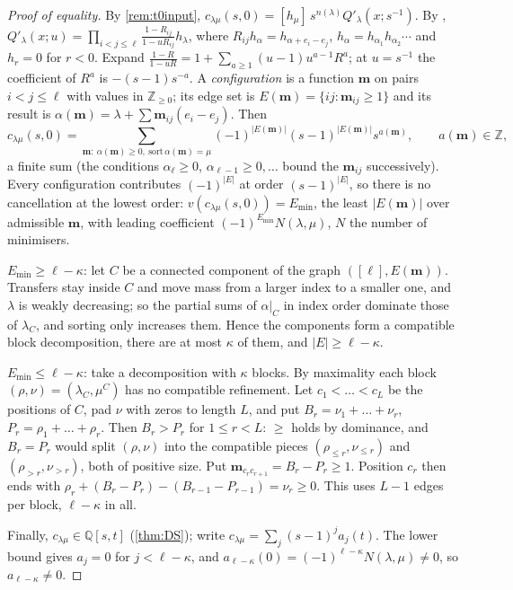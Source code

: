 \documentclass[11pt]{amsart}
\theoremstyle{definition}
\theoremstyle{remark}
\numberwithin{equation}{section}
\newcommand{\val}{v}
\begin{document}
\begin{proof}[Proof of equality]
By \cref{rem:t0input}, $c_{\lambda\mu}(s,0)=[h_\mu]\,s^{n(\lambda)}Q'_\lambda(x;s^{-1})$. By \cite[III (2.15$'$) with \S5 Ex.~7(a)]{Macdonald95}, $Q'_\lambda(x;u)=\prod_{i<j\le\ell}\frac{1-R_{ij}}{1-uR_{ij}}h_\lambda$, where $R_{ij}h_\alpha=h_{\alpha+e_i-e_j}$, $h_\alpha=h_{\alpha_1}h_{\alpha_2}\cdots$ and $h_r=0$ for $r<0$. Expand $\frac{1-R}{1-uR}=1+\sum_{a\ge1}(u-1)u^{a-1}R^a$; at $u=s^{-1}$ the coefficient of $R^a$ is $-(s-1)s^{-a}$. A \emph{configuration} is a function $\mathbf m$ on pairs $i<j\le\ell$ with values in $\mathbb{Z}_{\ge0}$; its edge set is $E(\mathbf m)=\{ij:\mathbf m_{ij}\ge1\}$ and its result is $\alpha(\mathbf m)=\lambda+\sum\mathbf m_{ij}(e_i-e_j)$. Then
\[ c_{\lambda\mu}(s,0)=\sum_{\mathbf m:\ \alpha(\mathbf m)\ge0,\ \mathrm{sort}\,\alpha(\mathbf m)=\mu}(-1)^{|E(\mathbf m)|}(s-1)^{|E(\mathbf m)|}s^{a(\mathbf m)},\qquad a(\mathbf m)\in\mathbb{Z}, \]
a finite sum (the conditions $\alpha_\ell\ge0$, $\alpha_{\ell-1}\ge0,\dots$ bound the $\mathbf m_{ij}$ successively). Every configuration contributes $(-1)^{|E|}$ at order $(s-1)^{|E|}$, so there is no cancellation at the lowest order: $\val(c_{\lambda\mu}(s,0))=E_{\min}$, the least $|E(\mathbf m)|$ over admissible $\mathbf m$, with leading coefficient $(-1)^{E_{\min}}N(\lambda,\mu)$, $N$ the number of minimisers.

$E_{\min}\ge\ell-\kappa$: let $C$ be a connected component of the graph $([\ell],E(\mathbf m))$. Transfers stay inside $C$ and move mass from a larger index to a smaller one, and $\lambda$ is weakly decreasing; so the partial sums of $\alpha|_C$ in index order dominate those of $\lambda_C$, and sorting only increases them. Hence the components form a compatible block decomposition, there are at most $\kappa$ of them, and $|E|\ge\ell-\kappa$.

$E_{\min}\le\ell-\kappa$: take a decomposition with $\kappa$ blocks. By maximality each block $(\rho,\nu)=(\lambda_C,\mu^C)$ has no compatible refinement. Let $c_1<\dots<c_L$ be the positions of $C$, pad $\nu$ with zeros to length $L$, and put $B_r=\nu_1+\dots+\nu_r$, $P_r=\rho_1+\dots+\rho_r$. Then $B_r>P_r$ for $1\le r<L$: $\ge$ holds by dominance, and $B_r=P_r$ would split $(\rho,\nu)$ into the compatible pieces $(\rho_{\le r},\nu_{\le r})$ and $(\rho_{>r},\nu_{>r})$, both of positive size. Put $\mathbf m_{c_rc_{r+1}}=B_r-P_r\ge1$. Position $c_r$ then ends with $\rho_r+(B_r-P_r)-(B_{r-1}-P_{r-1})=\nu_r\ge0$. This uses $L-1$ edges per block, $\ell-\kappa$ in all.

Finally, $c_{\lambda\mu}\in\mathbb{Q}[s,t]$ (\cref{thm:DS}); write $c_{\lambda\mu}=\sum_j(s-1)^ja_j(t)$. The lower bound gives $a_j=0$ for $j<\ell-\kappa$, and $a_{\ell-\kappa}(0)=(-1)^{\ell-\kappa}N(\lambda,\mu)\ne0$, so $a_{\ell-\kappa}\ne0$.
\end{proof}
\end{document}
